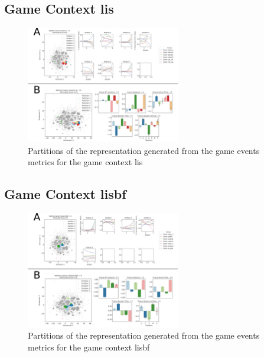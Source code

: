 \subsection{Game Context lis}
\label{even_clust_jc3}

\begin{figure}[!htb]
\includegraphics[width=0.6\textwidth]{images/appendix_D/clust_even_lis.png}
\centering
\caption[\textbf{Partitions of the representation generated from the game events metrics for the game context lis}]{Partitions of the representation generated from the game events metrics for the game context lis}
\end{figure}
\FloatBarrier

\subsection{Game Context lisbf}
\label{even_clust_lisbf}

\begin{figure}[!htb]
\includegraphics[width=0.6\textwidth]{images/appendix_D/clust_even_lisbf.png}
\centering
\caption[\textbf{Partitions of the representation generated from the game events metrics for the game context lisbf}]{Partitions of the representation generated from the game events metrics for the game context lisbf}
\end{figure}
\FloatBarrier